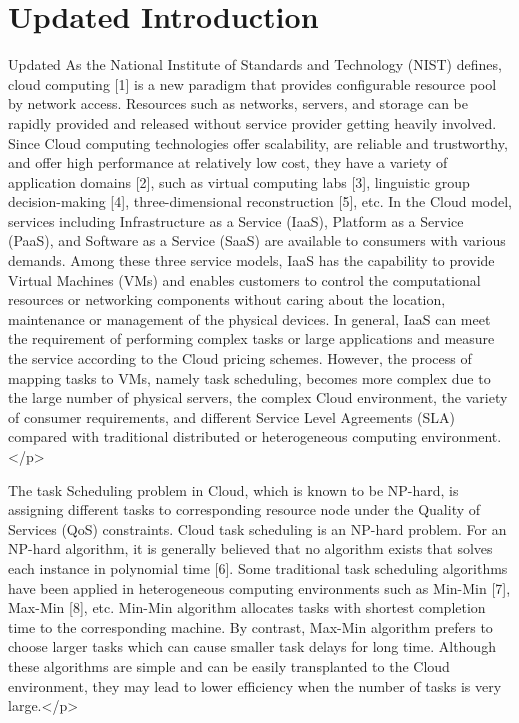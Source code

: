 \documentclass[conference]{IEEEtran}%
\begin{document}
\section{Updated Introduction}%
\label{sec:UpdatedIntroduction}%
Updated As the National Institute of Standards and Technology (NIST) defines, cloud computing [1] is a new paradigm that provides configurable resource pool by network access. Resources such as networks, servers, and storage can be rapidly provided and released without service provider getting heavily involved. Since Cloud computing technologies offer scalability, are reliable and trustworthy, and offer high performance at relatively low cost, they have a variety of application domains [2], such as virtual computing labs [3], linguistic group decision-making [4], three-dimensional reconstruction [5], etc. In the Cloud model, services including Infrastructure as a Service (IaaS), Platform as a Service (PaaS), and Software as a Service (SaaS) are available to consumers with various demands. Among these three service models, IaaS has the capability to provide Virtual Machines (VMs) and enables customers to control the computational resources or networking components without caring about the location, maintenance or management of the physical devices. In general, IaaS can meet the requirement of performing complex tasks or large applications and measure the service according to the Cloud pricing schemes. However, the process of mapping tasks to VMs, namely task scheduling, becomes more complex due to the large number of physical servers, the complex Cloud environment, the variety of consumer requirements, and different Service Level Agreements (SLA) compared with traditional distributed or heterogeneous computing environment.</p>

 The task Scheduling problem in Cloud, which is known to be NP-hard, is assigning different tasks to corresponding resource node under the Quality of Services (QoS) constraints. Cloud task scheduling is an NP-hard problem. For an NP-hard algorithm, it is generally believed that no algorithm exists that solves each instance in polynomial time [6]. Some traditional task scheduling algorithms have been applied in heterogeneous computing environments such as Min-Min [7], Max-Min [8], etc. Min-Min algorithm allocates tasks with shortest completion time to the corresponding machine. By contrast, Max-Min algorithm prefers to choose larger tasks which can cause smaller task delays for long time. Although these algorithms are simple and can be easily transplanted to the Cloud environment, they may lead to lower efficiency when the number of tasks is very large.</p>
\end{document}
